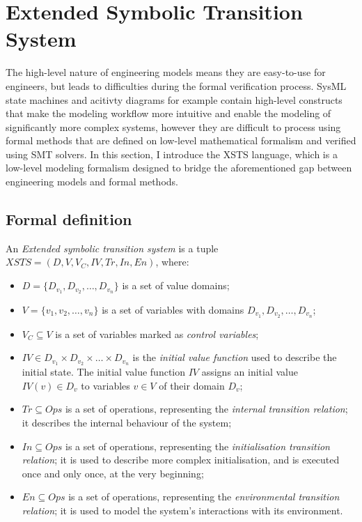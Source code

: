 \section{Extended Symbolic Transition System}\label{sec:xsts}

The high-level nature of engineering models means they are easy-to-use for engineers, but leads to difficulties during the formal verification process. SysML state machines and acitivty diagrams for example contain high-level  constructs that make the modeling workflow more intuitive and enable the modeling of significantly more complex systems, however they are difficult to process using formal methods that are defined on low-level mathematical formalism and verified using SMT solvers. In this section, I introduce the XSTS \cite{xsts} language, which is a low-level modeling formalism designed to bridge the aforementioned gap between engineering models and formal methods.

\subsection{Formal definition}

\begin{definition}
	
	An \emph{Extended symbolic transition system} is a tuple \( XSTS = (D, V, V_C, IV, Tr, In, En) \), where:
	
	\begin{itemize}
		\item \(D = \{ D_{v_1}, D_{v_2}, \dots, D_{v_n} \} \) is a set of value domains;
		\item \(V = \{ v_1, v_2, \dots, v_n \} \) is a set of variables with domains \(D_{v_1}, D_{v_2}, \dots, D_{v_n}\);
		\item \(V_C \subseteq V\) is a set of variables marked as \emph{control variables};
		\item \(IV \in D_{v_1} \times D_{v_2} \times \dots \times D_{v_n}\) is the \emph{initial value function} used to describe the initial state. The initial value function \(IV\) assigns an initial value \(IV(v) \in D_v\) to variables \(v \in V\) of their domain \(D_v\);
		\item \(Tr \subseteq Ops\) is a set of operations, representing the \emph{internal transition relation}; it describes the internal behaviour of the system;
		\item \(In \subseteq Ops\) is a set of operations, representing the \emph{initialisation transition relation}; it is used to describe more complex initialisation, and is executed once and only once, at the very beginning;
		\item \(En \subseteq Ops\) is a set of operations, representing the \emph{environmental transition relation}; it is used to model the system's interactions with its environment.
	\end{itemize}
\end{definition}\label{def:xsts}

